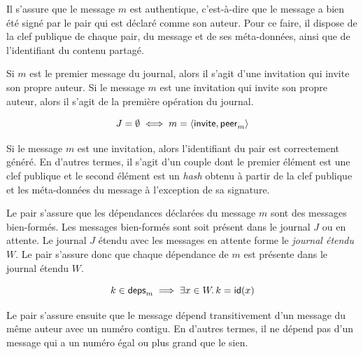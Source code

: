 
Il s'assure que le message $m$ est authentique, c'est-à-dire que le message a bien été signé par le pair qui est déclaré comme son auteur.
Pour ce faire, il dispose de la clef publique de chaque pair, du message et de ses méta-données, ainsi que de l'identifiant du contenu partagé.



Si $m$ est le premier message du journal, alors il s'agit d'une invitation qui invite son propre auteur.
Si le message $m$ est une invitation qui invite son propre auteur, alors il s'agit de la première opération du journal.

\begin{equation}\label{eq:wf-first-invit-verif}
    J = \emptyset \iff m = \tuple*{\trm{invite}, \trm{peer}_m}
\end{equation}

Si le message $m$ est une invitation, alors l'identifiant du pair est correctement généré.
En d'autres termes, il s'agit d'un couple dont le premier élément est une clef publique et le second élément est un \emph{hash} obtenu à partir de la clef publique et les méta-données du message à l'exception de sa signature.

Le pair s'assure que les dépendances déclarées du message $m$ sont des messages bien-formés.
Les messages bien-formés sont soit présent dans le journal $J$ ou en attente.
Le journal $J$ étendu avec les messages en attente forme le \emph{journal étendu} $W$.
Le pair s'assure donc que chaque dépendance de $m$ est présente dans le journal étendu $W$.

\begin{equation}\label{eq:wf-deps-verif}
    k \in \trm{deps}_m \implies \exists x \in W \qsep k = \trm{id}(x)
\end{equation}

Le pair s'assure ensuite que le message dépend transitivement d'un message du même auteur avec un numéro contigu.
En d'autres termes, il ne dépend pas d'un message qui a un numéro égal ou plus grand que le sien.

